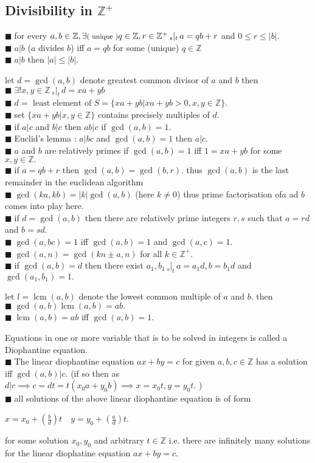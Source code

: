\documentclass[11pt]{extarticle}
\newcommand{\Z}{\mathbb{Z}}
\newcommand{\snote}[1]{{\footnotesize(#1)}}
\newcommand{\st}{\,{}_{s}|_t\,}
\newcommand{\tbx}[2][]{
\begin{tcolorbox}[enhanced,breakable,size=small,colback=black!2!white,title={#1},arc is angular, arc=1.5mm,
	drop fuzzy shadow]
	#2
\end{tcolorbox}
}
\newcommand{\y}{$\blacksquare\;$}
\DeclareMathOperator{\lcm}{lcm}
\begin{document}
\begin{multicols}{2}
\section{Divisibility in $ \Z^+ $}
\tbx{ \y  for every $ a,b\in \Z, \exists \text{\snote{ unique }}q\in \Z, r\in \Z^+ \st a=qb+r$  and $ 0\leq r\leq |b|. $ \\
\y $ a|b $ \snote{$ a $ divides $ b $} iff $ a=qb $ for some \snote{unique} $ q\in \Z $ \\
\y $ a|b $ then $ |a| \leq |b|.$ }
\tbx{let $d= \gcd(a,b) $ denote greatest common divisor of $ a $ and $ b $ then\\
\y $ \exists! x,y\in \Z\st d=xa+yb$ \\
\y $ d=\text{ least element of } S=\{xa+yb|xa+yb>0,x,y\in \Z\} $. \\
\y set $ \{xa+yb|x,y\in \Z\} $ contains precisely multiples of $ d .$\\ 
\y if $ a|c $ and $ b|c $ then $ ab|c $ if $ \gcd(a,b)=1 $.\\
\y Euclid's lemma : $ a|bc $ and $ \gcd(a,b)=1 $ then $ a|c .$\\
\y $ a $ and $ b $ are relatively primes if $ \gcd(a,b)=1 $ iff $ 1=xa+yb $ for some $ x,y\in \Z. $ \\
\y if $ a=qb+r  $ then $ \gcd(a,b)=\gcd(b,r) .$ thus $ \gcd(a,b) $ is the last remainder in the euclidean algorithm\\
\y $ \gcd(ka,kb)=|k|\gcd(a,b) $ \snote{here $ k\neq0 $} thus prime factorisation of$ a $ ad $ b $ comes into play here.\\
\y if $ d=\gcd(a,b) $ then there are relatively prime integers $ r,s $ such that $ a=rd $ and $ b=sd. $ \\
\y $ \gcd(a,bc)=1 $ iff $ \gcd(a,b) =1$ and $ \gcd(a,c) =1.$ \\
\y $ \gcd(a,n)= \gcd(kn\pm a, n)$ for all $ k\in \Z^+ .$ \\
\y if $ \gcd(a,b)=d $ then there exist $ a_1,b_1\st a=a_1d,b=b_1d $ and $ \gcd(a_1,b_1)=1. $}
\tbx{ let $ l= \lcm(a,b)$ denote the lowest common multiple of $ a $ and $ b. $ then\\
 \y $ \gcd(a,b)\lcm(a,b)=ab. $ \\
 \y $ \lcm(a,b)=ab $ iff $ \gcd(a,b)=1. $  }
\tbx[ Diophantine equations]{  Equations in one or more variable that is to be solved in integers is called a Diophantine equation.\\
\y The linear diophantine equation $ ax+by=c $ for given $ a,b,c\in \Z $ has a solution iff $ \gcd(a,b)|c .$
\snote{if so then as $ d|c\implies c=dt=t(x_0a+y_0b )\implies x=x_0t,y=y_0t.$ }\\
\y all solutions of the above linear diophantine equation is of form
\begin{center}
	$ x=x_0+\left(\frac{ b }{d} \right)t \quad y=y_0+\left(\frac{ a }{d} \right) t.$
	\end{center} for some solution $ x_0,y_0 $ and arbitrary $ t\in \Z$ i.e. there are infinitely many solutions for the linear diophatine equation $ ax+by=c. $ }
\newcolumn

\end{multicols}
\end{document}
